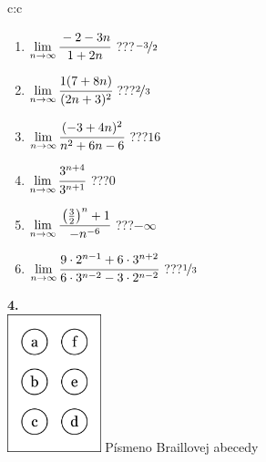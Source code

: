 \documentclass[10pt]{report}
\begin{document}
\begin{tabular}{c:c}
\begin{minipage}[c][104.5mm][t]{0.5\linewidth}
\begin{center}
\begin{minipage}{0.79\linewidth}
\begin{center}
\begin{varwidth}{\linewidth}
\begin{enumerate}
\normalsize
\item $\lim\limits_{n\to\infty}\cfrac{-2-3n}{1+2n}$\quad \dotfill\; ???\;\dotfill \quad $\nicefrac{-3}{2}$
\item $\lim\limits_{n\to\infty}\cfrac{1(7+8n)}{(2n+3)^2}$\quad \dotfill\; ???\;\dotfill \quad $\nicefrac{2}{3}$
\item $\lim\limits_{n\to\infty}\cfrac{(-3+4n)^2}{n^2+6n-6}$\quad \dotfill\; ???\;\dotfill \quad $16$
\item $\lim\limits_{n\to\infty}\cfrac{3^{n+4}}{3^{n+1}}$\quad \dotfill\; ???\;\dotfill \quad $0$
\item $\lim\limits_{n\to\infty}\cfrac{\left(\frac{3}{2}\right)^n +1}{-n^{-6}}$\quad \dotfill\; ???\;\dotfill \quad $-\infty$
\item $\lim\limits_{n\to\infty}\cfrac{9\cdot 2^{n-1}+6\cdot 3^{n+2}}{6\cdot 3^{n-2}-3\cdot 2^{n-2}}$\quad \dotfill\; ???\;\dotfill \quad $\nicefrac{1}{3}$
\end{enumerate}
\end{varwidth}
\end{center}
\end{minipage}
\begin{minipage}{0.20\linewidth}
\begin{center}
{\Huge\bfseries 4.} \\[2mm]
\includegraphics[height=40mm]{../images/braille.png}
{\small Písmeno Braillovej abecedy}
\end{center}
\end{minipage}
\end{center}
\end{minipage}
%
\end{tabular}
\newpage
\thispagestyle{empty}
\end{document}
